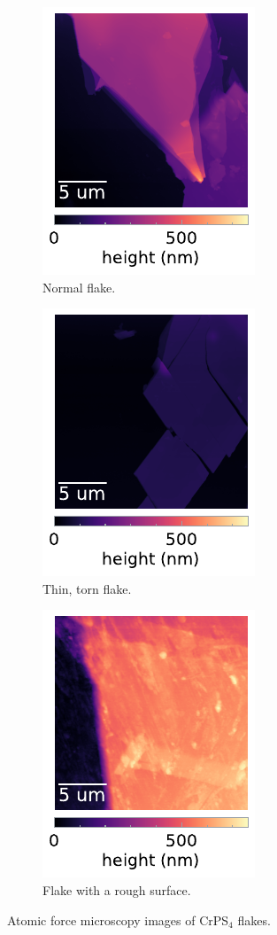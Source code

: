 \documentclass[
	oneside,
	parskip=half,
	a4paper,
]{scrbook}
\begin{document}
\begin{figure}
	\centering
	\begin{subfigure}[t]{1.8in}
		\includegraphics{../figures/2024-04-19 AFM (a).pdf}
		\caption{Normal flake.}
		\label{fig:AFM normal}
	\end{subfigure}
	\begin{subfigure}[t]{1.8in}
		\includegraphics{../figures/2024-04-19 AFM (b).pdf}
		\caption{Thin, torn flake.}
		\label{fig:AFM torn}
	\end{subfigure}
	\begin{subfigure}[t]{1.8in}
		\includegraphics{../figures/2024-04-19 AFM (c).pdf}
		\caption{Flake with a rough surface.}
		\label{fig:AFM rough}
	\end{subfigure}
	\caption{Atomic force microscopy images of CrPS$_4$ flakes.}
	\label{fig:AFM}
\end{figure}
\end{document}

